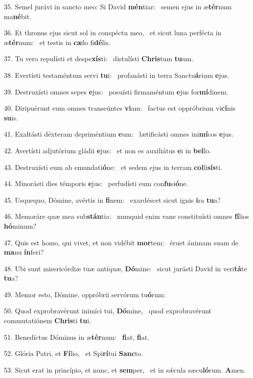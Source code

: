 35. Semel jurávi in sancto meo: Si David \textbf{mén}tiar: \ast\  semen ejus in æ\textbf{tér}num ma\textbf{né}bit.\

36. Et thronus ejus sicut sol in conspéctu meo, \dag\  et sicut luna perfécta in æ\textbf{tér}num: \ast\  et testis in \textbf{cæ}lo fi\textbf{dé}lis.\

37. Tu vero repulísti et despe\textbf{xís}ti: \ast\  distulísti \textbf{Chris}tum \textbf{tu}um.\

38. Evertísti testaméntum servi \textbf{tu}i: \ast\  profanásti in terra Sanctu\textbf{á}rium \textbf{e}jus.\

39. Destruxísti omnes sepes \textbf{e}jus: \ast\  posuísti firmaméntum \textbf{e}jus for\textbf{mí}dinem.\

40. Diripuérunt eum omnes transeúntes \textbf{vi}am: \ast\  factus est oppróbrium vi\textbf{cí}nis \textbf{su}is.\

41. Exaltásti déxteram depriméntium \textbf{e}um: \ast\  lætificásti omnes ini\textbf{mí}cos \textbf{e}jus.\

42. Avertísti adjutórium gládii \textbf{e}jus: \ast\  et non es auxiliátus \textbf{e}i in \textbf{bel}lo.\

43. Destruxísti eum ab emundati\textbf{ó}ne: \ast\  et sedem ejus in terram \textbf{col}li\textbf{sís}ti.\

44. Minorásti dies témporis \textbf{e}jus: \ast\  perfudísti eum con\textbf{fu}si\textbf{ó}ne.\

45. Usquequo, Dómine, avértis in \textbf{fi}nem: \ast\  exardéscet sicut ignis \textbf{i}ra \textbf{tu}a?\

46. Memoráre quæ mea sub\textbf{stán}tia: \ast\  numquid enim vane constituísti omnes \textbf{fí}lios \textbf{hó}minum?\

47. Quis est homo, qui vivet, et non vidébit \textbf{mor}tem: \ast\  éruet ánimam suam de \textbf{ma}nu \textbf{ín}feri?\

48. Ubi sunt misericórdiæ tuæ antíquæ, \textbf{Dó}mine: \ast\  sicut jurásti David in veri\textbf{tá}te \textbf{tu}a?\

49. Memor esto, Dómine, oppróbrii servórum tu\textbf{ó}rum: \ast\  \

50. Quod exprobravérunt inimíci tui, \textbf{Dó}mine, \ast\  quod exprobravérunt commutatiónem \textbf{Chris}ti \textbf{tu}i.\

51. Benedíctus Dóminus in æ\textbf{tér}num: \ast\  \textbf{fi}at, \textbf{fi}at.\

52. Glória Patri, et \textbf{Fí}lio, \ast\  et Spi\textbf{rí}tui \textbf{Sanc}to.\

53. Sicut erat in princípio, et nunc, et \textbf{sem}per, \ast\  et in sǽcula sæcu\textbf{ló}rum. \textbf{A}men.\


